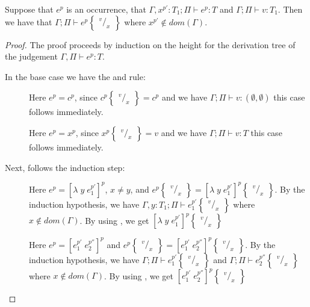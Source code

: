 \documentclass[../../master.tex]{subfiles}
\begin{document}
\begin{lemma}
	Suppose that $e^p$ is an occurrence, that 
	$\Gamma,x^{p'}:T_1;\Pi\vdash e^p:T$ 
	and 
	$\Gamma;\Pi\vdash v:T_1$.
	Then we have that
	$\Gamma;\Pi\vdash e^p\begin{Bmatrix} ^v/_x \end{Bmatrix}$
	where $x^{p'}\not\in dom(\Gamma)$.
\end{lemma}
\begin{proof}
	The proof proceeds by induction on the height for the derivation tree of the judgement $\Gamma,\Pi\vdash e^p:T$.
	
	In the base case we have the  and  rule:
	\begin{description}
		\item[] Here $e^p=c^p$, since $c^p\begin{Bmatrix} ^v/_x \end{Bmatrix}=c^p$ and we have $\Gamma;\Pi\vdash v:(\emptyset,\emptyset)$ this case follows immediately.

		\item[] Here $e^p=x^p$, since $x^p\begin{Bmatrix} ^v/_x \end{Bmatrix}=v$ and we have $\Gamma;\Pi\vdash v:T$ this case follows immediately.
	\end{description}

	Next, follows the induction step:
	\begin{description}
		\item[] Here $e^p=[\lambda\;y\;e_1^{p'}]^p$, $x\neq y$, and $e^p\begin{Bmatrix} ^v/_x \end{Bmatrix}=[\lambda\;y\;e_1^{p'}]^p\begin{Bmatrix} ^v/_x \end{Bmatrix}$.
			By the induction hypothesis, we have $\Gamma,y:T_1;\Pi\vdash e_1^{p'}\begin{Bmatrix} ^v/_x \end{Bmatrix}$ where $x\notin dom(\Gamma)$.
			By using , we get $[\lambda\;y\;e_1^{p'}]^p\begin{Bmatrix} ^v/_x \end{Bmatrix}$

		\item[] Here $e^p=[e_1^{p'}\;e_2^{p''}]^p$ and $e^p\begin{Bmatrix} ^v/_x \end{Bmatrix}=[e_1^{p'}\;e_2^{p''}]^p\begin{Bmatrix} ^v/_x \end{Bmatrix}$.
			By the induction hypothesis, we have $\Gamma;\Pi\vdash e_1^{p'}\begin{Bmatrix} ^v/_x \end{Bmatrix}$ and $\Gamma;\Pi\vdash e_2^{p''}\begin{Bmatrix} ^v/_x \end{Bmatrix}$ where $x\notin dom(\Gamma)$.
			By using , we get $[e_1^{p'}\;e_2^{p''}]^p\begin{Bmatrix} ^v/_x \end{Bmatrix}$


\end{description}
\end{proof}
\end{document}
